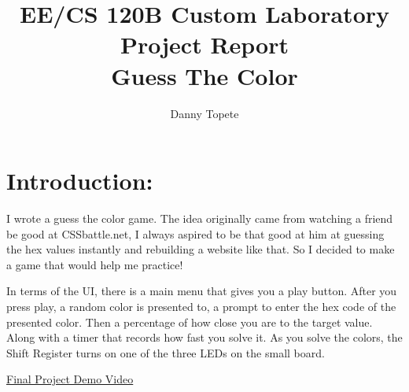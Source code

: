 \documentclass[12pt]{article}
\begin{document}

\title{EE/CS 120B Custom Laboratory Project Report\\
Guess The Color}
\author{Danny Topete}

\maketitle

\doublespacing

\section{Introduction:}
I wrote a guess the color game. The idea originally came from watching a friend 
be good at CSSbattle.net,
I always aspired to be that good at him at guessing the hex values instantly and rebuilding a website like that.
So I decided to make a game that would help me practice!

In terms of the UI, there is a main menu that gives you a play button. After you press play,
a random color is presented to, a prompt to enter the
hex code of the presented color. Then a percentage
of how close you are to the target value. Along with
a timer that records how fast you solve it.
As you solve the colors, the Shift Register turns on one of the
three LEDs on the small board.

\href{https://www.youtube.com/}{Final Project Demo Video}

\pagebreak
\end{document}
